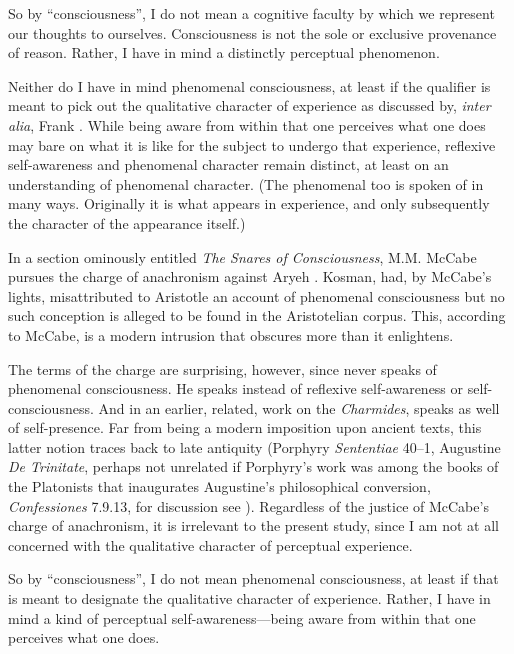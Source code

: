 
So by ``consciousness'', I do not mean a cognitive faculty by which we represent our thoughts to ourselves. Consciousness is not the sole or exclusive provenance of reason. Rather, I have in mind a distinctly perceptual phenomenon. 

Neither do I have in mind phenomenal consciousness, at least if the qualifier is meant to pick out the qualitative character of experience as discussed by, \emph{inter alia}, Frank \citet{Jackson:1982my}. While being aware from within that one perceives what one does may bare on what it is like for the subject to undergo that experience, reflexive self-awareness and phenomenal character remain distinct, at least on an understanding of phenomenal character. (The phenomenal too is spoken of in many ways. Originally it is what appears in experience, and only subsequently the character of the appearance itself.) 

In a section ominously entitled \emph{The Snares of Consciousness}, M.M. McCabe \citeyearpar{McCabe:2007jb} pursues the charge of anachronism against Aryeh \citet{Kosman:2014ab}. Kosman, had, by McCabe's lights, misattributed to Aristotle an account of phenomenal consciousness but no such conception is alleged to be found in the Aristotelian corpus. This, according to McCabe, is a modern intrusion that obscures more than it enlightens.

The terms of the charge are surprising, however, since \citet{Kosman:2014ab} never speaks of phenomenal consciousness. He speaks instead of reflexive self-awareness or self-consciousness. And in an earlier, related, work on the \emph{Charmides}, \citet{Kosman:2014aa} speaks as well of self-presence. Far from being a modern imposition upon ancient texts, this latter notion traces back to late antiquity (Porphyry \emph{Sententiae} 40–1, Augustine \emph{De Trinitate}, perhaps not unrelated if Porphyry's work was among the books of the Platonists that inaugurates Augustine's philosophical conversion, \emph{Confessiones} 7.9.13, for discussion see \citealt[chapter 12]{Sorabji:2006aa}). Regardless of the justice of McCabe's charge of anachronism, it is irrelevant to the present study, since I am not at all concerned with the qualitative character of perceptual experience. 

So by ``consciousness'', I do not mean phenomenal consciousness, at least if that is meant to designate the qualitative character of experience. Rather, I have in mind a kind of perceptual self-awareness—being aware from within that one perceives what one does. 

